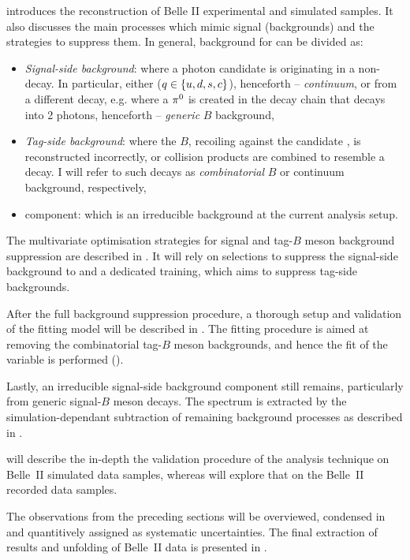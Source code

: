  introduces the reconstruction of Belle II experimental and simulated \BtoXsgamma samples.
It also discusses the main processes which mimic \BtoXsgamma signal (backgrounds) and the strategies to suppress them.
In general, background for \BtoXsgamma can be divided as:
\begin{itemize}
    \item \textit{Signal-side background}: where a photon candidate is originating in a non-\BtoXsgamma decay.
    In particular, either \epem\ra\qqbar ($q\in\{u,d,s,c\}$), henceforth -- \textit{continuum}, or from a different \B decay, e.g. where a $\pi^0$ is created in the decay chain that decays into 2 photons, henceforth -- \textit{generic} $B$ background,
    \item \textit{Tag-side background}: where the $B$, recoiling against the candidate \BtoXsgamma, is reconstructed incorrectly, or \epem\ra\qqbar collision products are combined to resemble a \B decay.
    I will refer to such decays as \textit{combinatorial} $B$ or continuum background, respectively,
    \item \BtoXdgamma component: which is an irreducible background at the current analysis setup. 
\end{itemize}

The
multivariate optimisation strategies for signal and tag-$B$ meson background suppression are described in 
.
It will rely on selections to suppress the signal-side background to and a dedicated \BDT training, which aims to suppress tag-side backgrounds.

After the full background suppression procedure, a thorough setup and validation of the fitting model will be described in .
The fitting procedure is aimed at removing the combinatorial tag-$B$ meson backgrounds, and hence the fit of the \Mbc variable is performed ().

Lastly, an irreducible signal-side background component still remains, particularly from generic signal-$B$ meson decays.
The \EB spectrum is extracted by the simulation-dependant subtraction of remaining background processes as described in .

 will describe the in-depth the validation procedure of the analysis technique on Belle~II simulated data samples,
whereas  will explore that on the Belle~II recorded data samples.

The observations from the preceding sections will be overviewed, condensed in  and quantitively assigned as systematic uncertainties.
The final extraction of results and unfolding of Belle~II data is presented in .
